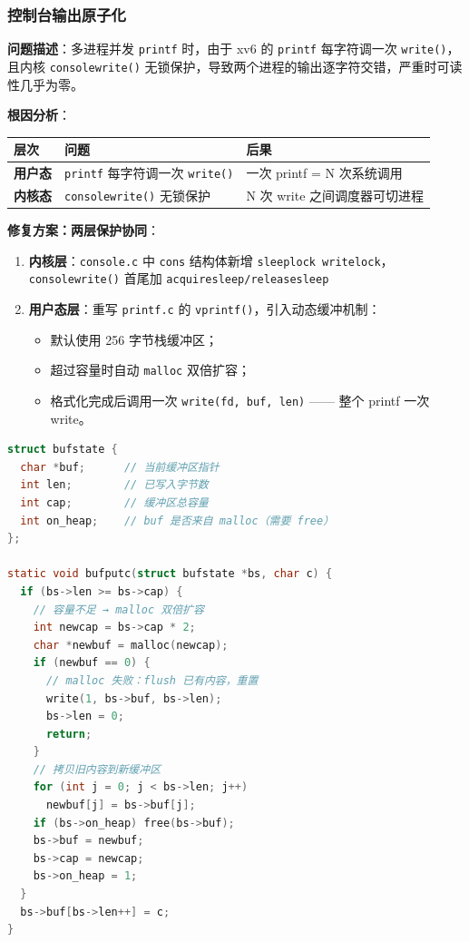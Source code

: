 \documentclass[12pt,a4paper]{ctexart}
\begin{document}
\subsubsection{控制台输出原子化}

\textbf{问题描述}：多进程并发 \texttt{printf} 时，由于 xv6 的 \texttt{printf} 每字符调一次 \texttt{write()}，且内核 \texttt{consolewrite()} 无锁保护，导致两个进程的输出逐字符交错，严重时可读性几乎为零。

\textbf{根因分析}：

\begin{table}[H]
\centering
\begin{tabular}{>{\bfseries}p{2cm}p{4.5cm}p{5.5cm}}
\toprule
\textbf{层次} & \textbf{问题} & \textbf{后果} \\
\midrule
用户态 & \texttt{printf} 每字符调一次 \texttt{write()} & 一次 printf = N 次系统调用 \\
内核态 & \texttt{consolewrite()} 无锁保护 & N 次 write 之间调度器可切进程 \\
\bottomrule
\end{tabular}
\end{table}

\textbf{修复方案：两层保护协同}：

\begin{enumerate}
  \item \textbf{内核层}：\texttt{console.c} 中 \texttt{cons} 结构体新增 \texttt{sleeplock writelock}，\texttt{consolewrite()} 首尾加 \texttt{acquiresleep/releasesleep}

  \item \textbf{用户态层}：重写 \texttt{printf.c} 的 \texttt{vprintf()}，引入动态缓冲机制：
    \begin{itemize}
      \item 默认使用 256 字节栈缓冲区；
      \item 超过容量时自动 \texttt{malloc} 双倍扩容；
      \item 格式化完成后调用一次 \texttt{write(fd, buf, len)} —— 整个 printf 一次 write。
    \end{itemize}
\end{enumerate}

\begin{lstlisting}[language=C, caption={动态缓冲核心数据结构（user/printf.c）}]
struct bufstate {
  char *buf;      // 当前缓冲区指针
  int len;        // 已写入字节数
  int cap;        // 缓冲区总容量
  int on_heap;    // buf 是否来自 malloc（需要 free）
};

static void bufputc(struct bufstate *bs, char c) {
  if (bs->len >= bs->cap) {
    // 容量不足 → malloc 双倍扩容
    int newcap = bs->cap * 2;
    char *newbuf = malloc(newcap);
    if (newbuf == 0) {
      // malloc 失败：flush 已有内容，重置
      write(1, bs->buf, bs->len);
      bs->len = 0;
      return;
    }
    // 拷贝旧内容到新缓冲区
    for (int j = 0; j < bs->len; j++)
      newbuf[j] = bs->buf[j];
    if (bs->on_heap) free(bs->buf);
    bs->buf = newbuf;
    bs->cap = newcap;
    bs->on_heap = 1;
  }
  bs->buf[bs->len++] = c;
}
\end{lstlisting}
\end{document}
